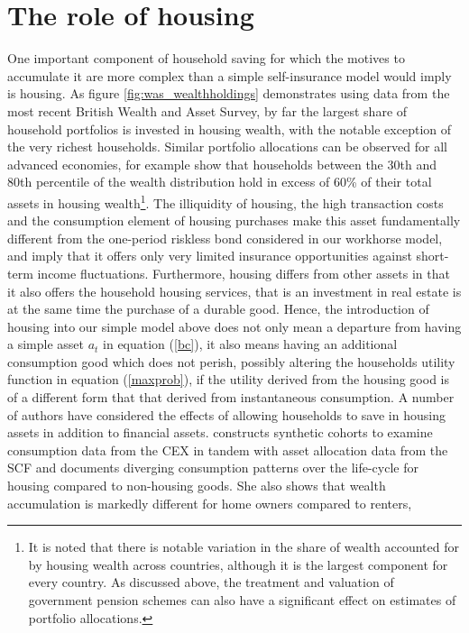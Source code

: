 \section{The role of housing}\label{housing}
One important component of household saving for which the motives to accumulate
it are more complex than a simple self-insurance model would imply is housing. 
As figure \ref{fig:was_wealthholdings} demonstrates using data from the most 
recent British Wealth and Asset Survey, by far the largest share of household
portfolios is invested in housing wealth, with the notable exception of the
very richest households. Similar portfolio allocations can be observed for all
advanced economies, \citet{FernandezVillaverdeKrueger2011} for example show that
households between the 30th and 80th percentile of the wealth distribution hold
in excess of 60\% of their total assets in housing wealth\footnote{It is noted 
that there is notable variation in the share of wealth accounted for by housing 
wealth across countries, although it is the largest component for every country.
As discussed above, the treatment and valuation of government pension schemes can
also have a significant effect on estimates of portfolio allocations.}. The illiquidity of 
housing, the high transaction costs and the consumption element of housing 
purchases make this asset fundamentally different from the one-period riskless 
bond considered in our workhorse model, and imply that it offers only very limited
insurance opportunities against short-term income fluctuations. Furthermore, 
housing differs from other assets in that it also offers the household housing
services, that is an investment in real estate is at the same time the purchase
of a durable good. Hence, the introduction of housing into our simple model
above does not only mean a departure from having a simple asset $a_t$ in 
equation (\ref{bc}), it also means having an additional consumption good which 
does not perish, possibly altering the households utility function in equation
(\ref{maxprob}), if the utility derived from the housing good is of a different 
form that that derived from instantaneous consumption. 
A number of authors have considered the effects of allowing households to save
in housing assets in addition to financial assets. \citet{Yang2009} constructs
synthetic cohorts to examine consumption data from the CEX in tandem with asset
allocation data from the SCF and documents diverging consumption patterns over 
the life-cycle for housing compared to non-housing goods. She also shows that
wealth accumulation is markedly different for home owners compared to renters,
